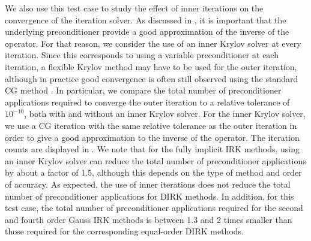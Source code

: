\documentclass[review]{siamart}
\begin{document}
We also use this test case to study the effect of inner iterations on the convergence of the iteration solver.
As discussed in , it is important that the underlying preconditioner provide a good approximation of the inverse of the operator.
For that reason, we consider the use of an inner Krylov solver at every iteration.
Since this corresponds to using a variable preconditioner at each iteration, a flexible Krylov method may have to be used for the outer iteration, although in practice good convergence is often still observed using the standard CG method \cite{Notay2000}.
In particular, we compare the total number of preconditioner applications required to converge the outer iteration to a relative tolerance of $10^{-10}$, both with and without an inner Krylov solver.
For the inner Krylov solver, we use a CG iteration with the same relative tolerance as the outer iteration in order to give a good approximation to the inverse of the operator.
The iteration counts are displayed in .
We note that for the fully implicit IRK methods, using an inner Krylov solver can reduce the total number of preconditioner applications by about a factor of 1.5, although this depends on the type of method and order of accuracy.
As expected, the use of inner iterations does not reduce the total number of preconditioner applications for DIRK methods.
In addition, for this test case, the total number of preconditioner applications required for the second and fourth order Gauss IRK methods is between 1.3 and 2 times smaller than those required for the corresponding equal-order DIRK methods.
\end{document}
